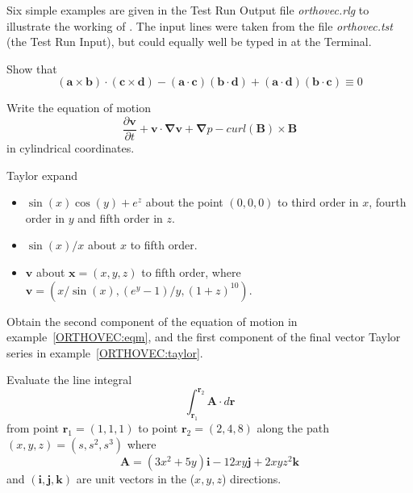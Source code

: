 Six  simple examples are given in the Test Run Output file 
\emph{orthovec.rlg} to illustrate the working of .  
The input lines were taken from the file
\emph{orthovec.tst} (the Test Run Input), but could 
equally well be typed in at the Terminal.

\example{}

Show that
\begin{equation*}
(\mathbf{a}  \times \mathbf{b}) \cdot (\mathbf{c} \times \mathbf{d}) - (\mathbf{a} 
\cdot \mathbf{c})(\mathbf{b} \cdot \mathbf{d})
 + (\mathbf{a} \cdot \mathbf{d})(\mathbf{b} \cdot \mathbf{c}) \equiv 0
\end{equation*}
 
\example{}\label{ORTHOVEC:eqm}

Write the equation of motion
\begin{equation*}
\frac{\partial \mathbf{v}}{\partial t} + \mathbf{v} \cdot \mathbf{\nabla v} 
+ \mathbf{\nabla} p - curl (\mathbf{B}) \times \mathbf{B}
\end{equation*}
in cylindrical coordinates.

\example{}\label{ORTHOVEC:taylor}

Taylor expand
\begin{itemize}
\item $\sin(x) \cos(y) +e^z$
about the point $(0,0,0)$ to third order in $x$, fourth order in $y$ and
fifth order in $z$.

\item $\sin(x)/x$ about $x$ to fifth order.

\item $\mathbf{v}$ about $\mathbf{x}=(x,y,z)$ to fifth order, where
$\mathbf{v} = (x/ \sin(x),(e^y-1)/y,(1+z)^{10})$.
\end{itemize}

\example{}

Obtain the second component of the equation of motion in
example~\ref{ORTHOVEC:eqm}, and the first component of the final
vector Taylor series in example~\ref{ORTHOVEC:taylor}.

\example{}

Evaluate the line integral 
\begin{equation*}
\int^{\mathbf{r}_2}_{\mathbf{r}_1} \mathbf{A} \cdot d\mathbf{r}
\end{equation*}
from point $\mathbf{r}_1 = (1,1,1)$ to point
$\mathbf{r}_2 = (2,4,8)$ along the path $(x,y,z) = (s, s^2, s^3)$ where
\begin{equation*}
\mathbf{A} = (3x^2 + 5y) \mathbf{i} - 12xy\mathbf{j} + 2xyz^2\mathbf{k}
\end{equation*}
and $(\mathbf{i, j, k})$ are unit vectors in the ($x,y,z$) directions.

